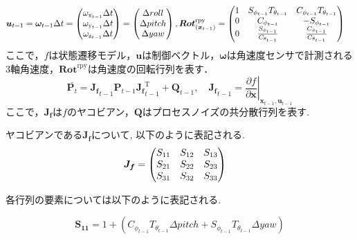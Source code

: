 \begin{equation}
	\begin{split}
		\bm{u}_{t-1}
		&=
		\bm{\omega}_{t-1} \Delta t
		=
		\begin{pmatrix}
			\omega_{\mathrm{x}_{t-1}} \Delta t \cr
			\omega_{\mathrm{y}_{t-1}} \Delta t \cr
			\omega_{\mathrm{z}_{t-1}} \Delta t
		\end{pmatrix}
            =
            \begin{pmatrix}
			\Delta roll \cr
			\Delta pitch \cr
			\Delta yaw
		\end{pmatrix}
		, %
		\bm{Rot}^\mathrm{rpy}_{(\bm{x}_{t-1})}
		=
		\begin{pmatrix}
			1 & S_{\phi_{t-1}} T_{\theta_{t-1}} & C_{\phi_{t-1}} T_{\theta_{t-1}} \cr
			0 & C_{\phi_{t-1}} & -S_{\phi_{t-1}} \cr
                0 & \frac{S_{\phi_{t-1}}}{C_{\theta_{t-1}}} & \frac{C_{\phi_{t-1}}}{C_{\theta_{t-1}}}
		 \end{pmatrix}
	\end{split}
\end{equation}
%
ここで，\(f\)は状態遷移モデル，\(\bm{u}\)は制御ベクトル，\(\bm{\omega}\)は角速度センサで計測される3軸角速度，\(\bm{Rot}^\mathrm{rpy}\)は角速度の回転行列を表す．
%
\begin{equation}
	\bar{\bm{P}_{t}}
	=
	{\bm{J_f}}_{t-1} \bm{P}_{t-1} {\bm{J_f}}_{t-1}^\mathrm{T} + \bm{Q}_{t-1}
	,\quad%
	{\bm{J_f}}_{t-1}
	=
	\left. \frac{\partial f}{\partial \bm{x}} \right|_{\bm{x}_{t-1}, \bm{u}_{t-1}}
\end{equation}
%
ここで，\(\bm{J_f}\)は\(f\)のヤコビアン，\(\bm{Q}\)はプロセスノイズの共分散行列を表す.


ヤコビアンである\(\bm{J_f}\)について, 以下のように表記される.
\begin{equation}
	\begin{split}
		\bm{J_f}
		&=
		\begin{pmatrix}
			S_{11} & S_{12} & S_{13} \cr
			S_{21} & S_{22} & S_{23} \cr
                S_{31} & S_{32} & S_{33}
		\end{pmatrix}
\end{split}
\end{equation}

各行列の要素については以下のように表記される.

\begin{equation}
            \bm{S_{11}} =  1 + (C_{\phi_{t-1}} T_{\theta_{t-1}} \Delta pitch + S_{\phi_{t-1}} T_{\theta_{t-1}} \Delta yaw )
\end{equation}


